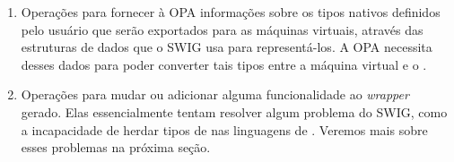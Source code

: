   \begin{enumerate}
    \item Operações para fornecer à OPA informações sobre os tipos nativos definidos pelo
      usuário que serão exportados para as máquinas virtuais, através das estruturas de dados
      que o SWIG usa para representá-los. A OPA necessita desses dados para poder converter
      tais tipos entre a máquina virtual e o \CXX{}.
    \item Operações para mudar ou adicionar alguma funcionalidade ao \textit{wrapper}
      gerado. Elas essencialmente tentam resolver algum problema do SWIG, como
      a incapacidade de herdar tipos de \CXX{} nas linguagens de \script{}. Veremos mais
      sobre esses problemas na próxima seção.
  \end{enumerate}
  
